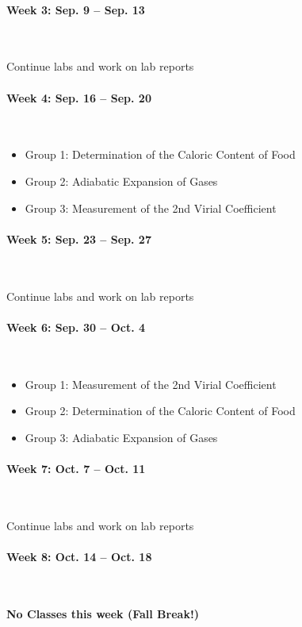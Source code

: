 \documentclass[12pt, letterpaper]{article}
\begin{document}
\paragraph{Week 3: Sep. 9 -- Sep. 13}~

Continue labs and work on lab reports

\paragraph{Week 4: Sep. 16 -- Sep. 20}~

\begin{itemize}
  \item Group 1: Determination of the Caloric Content of Food
  \item Group 2: Adiabatic Expansion of Gases
  \item Group 3: Measurement of the 2nd Virial Coefficient
\end{itemize}

\paragraph{Week 5: Sep. 23 -- Sep. 27}~

Continue labs and work on lab reports

\paragraph{Week 6: Sep. 30 -- Oct. 4}~

\begin{itemize}
  \item Group 1: Measurement of the 2nd Virial Coefficient
  \item Group 2: Determination of the Caloric Content of Food
  \item Group 3: Adiabatic Expansion of Gases
\end{itemize}

\paragraph{Week 7: Oct. 7 -- Oct. 11}~

Continue labs and work on lab reports

\paragraph{Week 8: Oct. 14 -- Oct. 18}~

\textbf{No Classes this week (Fall Break!)}
\end{document}
